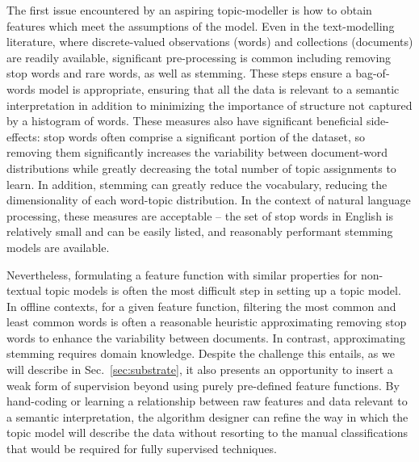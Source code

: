 The first issue encountered by an aspiring topic-modeller is how to obtain features which meet the assumptions of the model. Even in the text-modelling literature, where discrete-valued observations (words) and collections (documents) are readily available, significant pre-processing is common including removing stop words and rare words, as well as stemming. These steps ensure a bag-of-words model is appropriate, ensuring that all the data is relevant to a semantic interpretation in addition to minimizing the importance of structure not captured by a histogram of words. These measures also have significant beneficial side-effects: stop words often comprise a significant portion of the dataset, so removing them significantly increases the variability between document-word distributions while greatly decreasing the total number of topic assignments to learn. In addition, stemming can greatly reduce the vocabulary, reducing the dimensionality of each word-topic distribution. In the context of natural language processing, these measures are acceptable -- the set of stop words in English is relatively small and can be easily listed, and reasonably performant stemming models are available.

Nevertheless, formulating a feature function with similar properties for non-textual topic models is often the most difficult step in setting up a topic model. In offline contexts, for a given feature function, filtering the most common and least common words is often a reasonable heuristic approximating removing stop words to enhance the variability between documents. In contrast, approximating stemming requires domain knowledge. Despite the challenge this entails, as we will describe in Sec.~\ref{sec:substrate}, it also presents an opportunity to insert a weak form of supervision beyond using purely pre-defined feature functions. By hand-coding or learning a relationship between raw features and data relevant to a semantic interpretation, the algorithm designer can refine the way in which the topic model will describe the data without resorting to the manual classifications that would be required for fully supervised techniques.


